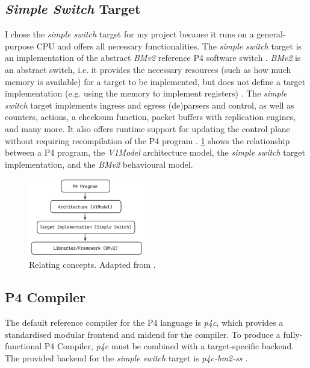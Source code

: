 \subsection{\textit{Simple Switch} Target}
\label{sec:2.4.2}

I chose the \textit{simple switch} target for my project because it runs on a general-purpose CPU and offers all necessary functionalities. The \textit{simple switch} target is an implementation of the abstract \textit{BMv2} reference P4 software switch \cite{BMv2}. \textit{BMv2} is an abstract switch, i.e. it provides the necessary resources (such as how much memory is available) for a target to be implemented, but does not define a target implementation (e.g. using the memory to implement registers) \cite{P4LangTutorial}. The \textit{simple switch} target implements ingress and egress (de)parsers and control, as well as counters, actions, a checksum function, packet buffers with replication engines, and many more. It also offers runtime support for updating the control plane without requiring recompilation of the P4 program \cite{BMv2target}. \cref{fig:prep-relation} shows the relationship between a P4 program, the \textit{V1Model} architecture model, the \textit{simple switch} target implementation, and the \textit{BMv2} behavioural model.

\begin{figure}[htbp]
  \centering
    \includegraphics[width=0.45\textwidth]{figures/preparation/control_flow.jpg}
     \caption{Relating concepts. Adapted from \cite{P4Architecture}.}
     \label{fig:prep-relation}
\end{figure}



\subsection{P4 Compiler}
\label{sec:2.4.3}

The default reference compiler for the P4 language is \textit{p4c}, which provides a standardised modular frontend and midend for the compiler. To produce a fully-functional P4 Compiler, \textit{p4c} must be combined with a target-specific backend. The provided backend for the \textit{simple switch} target is \textit{p4c-bm2-ss} \cite{P4Compilers}.

